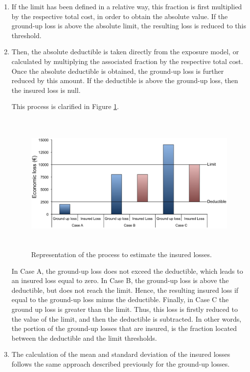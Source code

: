 \begin{enumerate}

\item If the limit has been defined in a relative way, this fraction is first multiplied by the respective total cost, in order to obtain the absolute value. If the ground-up loss is above the absolute limit, the resulting loss is reduced to this threshold.

\item Then, the absolute deductible is taken directly from the exposure model, or calculated by multiplying the associated fraction by the respective total cost. Once the absolute deductible is obtained, the ground-up loss is further reduced by this amount. If the deductible is above the ground-up loss, then the insured loss is null.

This process is clarified in Figure \ref{fig:insuredLosses}.

\begin{figure}[ht]
\centering
\includegraphics[width=14cm,height=7cm]{./figures/risk/insuredLosses.eps}
\caption{Representation of the process to estimate the insured losses.}
\label{fig:insuredLosses}
\end{figure} 

In Case A, the ground-up loss does not exceed the deductible, which leads to an insured loss equal to zero. In Case B, the ground-up loss is above the deductible, but does not reach the limit. Hence, the resulting insured loss if equal to the ground-up loss minus the deductible. Finally, in Case C the ground up loss is greater than the limit. Thus, this loss is firstly reduced to the value of the limit, and then  the deductible is subtracted. In other words, the portion of the ground-up losses that are insured, is the fraction located between the deductible and the limit thresholds.   

\item The calculation of the mean and standard deviation of the insured losses follows the same approach described previously for the ground-up losses.

\end{enumerate}

